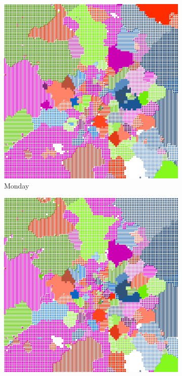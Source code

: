 \documentclass[12pt,a4paper]{article}
\begin{document}
\begin{figure}[H]
\centering
\begin{subfigure}[b]{0.35\textwidth}
\includegraphics[width=\textwidth]{weekDef/1Mon.png}
\caption{Monday}
\end{subfigure}
\begin{subfigure}[b]{0.35\textwidth}
\includegraphics[width=\textwidth]{weekDef/2Tue.png}

\end{subfigure}
\end{figure}
\end{document}
